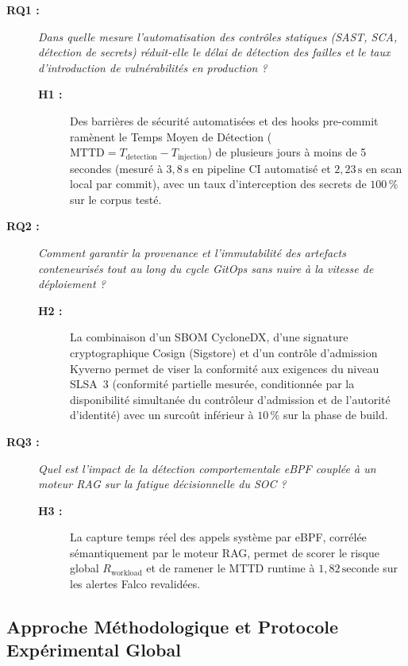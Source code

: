 \begin{description}
    \item[\textbf{RQ1 :}] \textit{Dans quelle mesure l'automatisation des contrôles statiques (SAST, SCA, détection de secrets) réduit-elle le délai de détection des failles et le taux d'introduction de vulnérabilités en production ?}
    \begin{description}
        \item[\textbf{H1 :}] Des barrières de sécurité automatisées et des hooks pre-commit ramènent le Temps Moyen de Détection ($\text{MTTD} = T_{\text{detection}} - T_{\text{injection}}$) de plusieurs jours à moins de 5 secondes (mesuré à $3{,}8\,\text{s}$ en pipeline CI automatisé et $2{,}23\,\text{s}$ en scan local par commit), avec un taux d'interception des secrets de $100\,\%$ sur le corpus testé.
    \end{description}
    \item[\textbf{RQ2 :}] \textit{Comment garantir la provenance et l'immutabilité des artefacts conteneurisés tout au long du cycle GitOps sans nuire à la vitesse de déploiement ?}
    \begin{description}
        \item[\textbf{H2 :}] La combinaison d'un SBOM CycloneDX, d'une signature cryptographique Cosign (Sigstore) et d'un contrôle d'admission Kyverno permet de viser la conformité aux exigences du niveau SLSA~3 (conformité partielle mesurée, conditionnée par la disponibilité simultanée du contrôleur d'admission et de l'autorité d'identité) avec un surcoût inférieur à $10\,\%$ sur la phase de build.
    \end{description}
    \item[\textbf{RQ3 :}] \textit{Quel est l'impact de la détection comportementale eBPF couplée à un moteur RAG sur la fatigue décisionnelle du SOC ?}
    \begin{description}
        \item[\textbf{H3 :}] La capture temps réel des appels système par eBPF, corrélée sémantiquement par le moteur RAG, permet de scorer le risque global $R_{\text{workload}}$ et de ramener le MTTD runtime à $1{,}82\,\text{seconde}$ sur les alertes Falco revalidées.
    \end{description}
\end{description}

\subsection{Approche Méthodologique et Protocole Expérimental Global}
\label{subsec:protocole_experimental}


